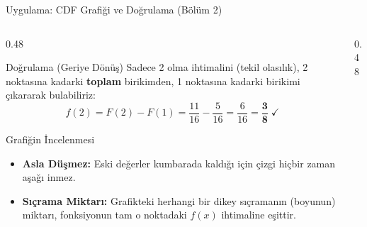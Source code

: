 ﻿\documentclass[light]{lutbeamer}
\begin{document}
\begin{frame}{Uygulama: CDF Grafiği ve Doğrulama (Bölüm 2)}
    \footnotesize
    \begin{columns}[T]
        \begin{column}{0.48\textwidth}
            \begin{block}{Doğrulama (Geriye Dönüş)}
              Sadece 2 olma ihtimalini (tekil olasılık), 2 noktasına kadarki \textbf{toplam} birikimden, 1 noktasına kadarki birikimi çıkararak bulabiliriz:
              \[
              f(2) = F(2) - F(1) = \frac{11}{16} - \frac{5}{16} = \frac{6}{16} = \mathbf{\frac{3}{8}} \;\checkmark
              \]
            \end{block}
            
            \vspace{0.3cm}
            \begin{exampleblock}{Grafiğin İncelenmesi}
                \begin{itemize}
                    \item \textbf{Asla Düşmez:} Eski değerler kumbarada kaldığı için çizgi hiçbir zaman aşağı inmez.
                    \item \textbf{Sıçrama Miktarı:} Grafikteki herhangi bir dikey sıçramanın (boyunun) miktarı, fonksiyonun tam o noktadaki $f(x)$ ihtimaline eşittir.
                \end{itemize}
            \end{exampleblock}
        \end{column}
        
        \begin{column}{0.48\textwidth}
            \centering
        \end{column}
    \end{columns}
\end{frame}
\end{document}

